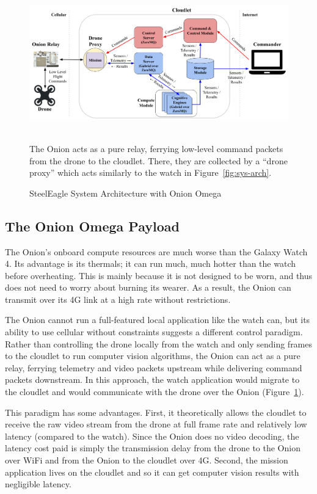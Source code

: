 \begin{figure}
    \centering
    \includegraphics[width=1.0\linewidth]{chapter5/FIGS/arch-onion.png}
    \begin{captext}
    \\[0.1cm]
        \small The Onion acts as a pure relay, ferrying low-level command packets from the drone to the cloudlet. There, they are collected by a ``drone proxy'' which acts similarly to the watch in Figure~\ref{fig:sys-arch}.
    \end{captext}
    \caption{SteelEagle System Architecture with Onion Omega}
    \label{fig:sys-arch-onion}
\end{figure}

\subsection{The Onion Omega Payload}

The Onion's onboard compute resources are much worse than the Galaxy Watch 4. Its advantage is its thermals; it can run much, much hotter than the watch before overheating. This is mainly because it is not designed to be worn, and thus does not need to worry about burning its wearer. As a result, the Onion can transmit over its 4G link at a high rate without restrictions.

The Onion cannot run a full-featured local application like the watch can, but its ability to use cellular without constraints suggests a different control paradigm. Rather than controlling the drone locally from the watch and only sending frames to the cloudlet to run computer vision algorithms, the Onion can act as a pure relay, ferrying telemetry and video packets upstream while delivering command packets downstream. In this approach, the watch application would migrate to the cloudlet and would communicate with the drone over the Onion (Figure~\ref{fig:sys-arch-onion}).

This paradigm has some advantages. First, it theoretically allows the cloudlet to receive the raw video stream from the drone at full frame rate and relatively low latency (compared to the watch). Since the Onion does no video decoding, the latency cost paid is simply the transmission delay from the drone to the Onion over WiFi and from the Onion to the cloudlet over 4G. Second, the mission application lives on the cloudlet and so it can get computer vision results with negligible latency.

